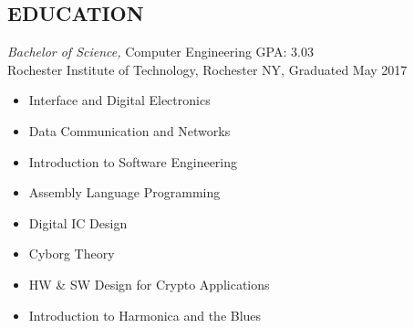 \documentclass[line,margin]{res}
\begin{document}
\begin{resume}
\section{EDUCATION} {\sl Bachelor of Science,} Computer Engineering GPA: 3.03\\
                Rochester Institute of Technology, Rochester NY, 
				Graduated May 2017 %
				\begin{multicols}{2}
					\begin{itemize}
						\itemsep -2pt
						\item[] Interface and Digital Electronics
						\item[] Data Communication and Networks
						\item[] Introduction to Software Engineering
						\item[] Assembly Language Programming
						\item[] Digital IC Design
						\item[] Cyborg Theory
						\item[] HW \& SW Design for Crypto Applications
						\item[] Introduction to Harmonica and the Blues


						
					\end{itemize}
				\end{multicols}
 

\end{resume}
\end{document}

